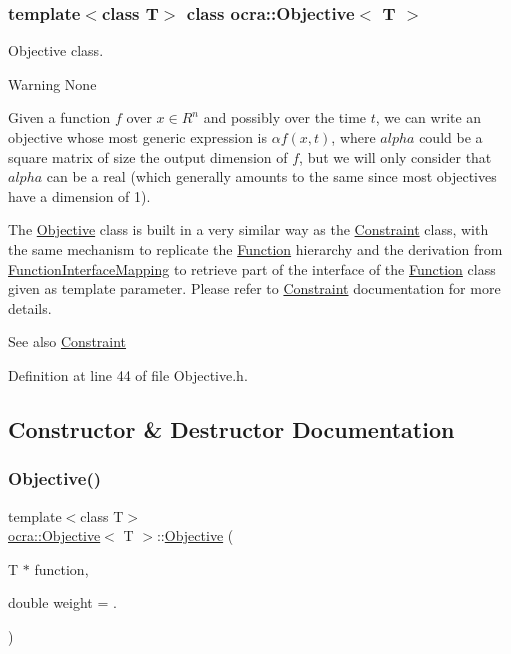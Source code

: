 \subsubsection*{template$<$class T$>$\newline
class ocra\+::\+Objective$<$ T $>$}

Objective class. 

\begin{DoxyWarning}{Warning}
None
\end{DoxyWarning}
Given a function $ f $ over $ x \in R^n $ and possibly over the time $ t $, we can write an objective whose most generic expression is $ \alpha f(x,t) $, where $ alpha $ could be a square matrix of size the output dimension of $ f $, but we will only consider that $ alpha $ can be a real (which generally amounts to the same since most objectives have a dimension of 1).

The \hyperlink{classocra_1_1Objective}{Objective} class is built in a very similar way as the \hyperlink{classocra_1_1Constraint}{Constraint} class, with the same mechanism to replicate the \hyperlink{classocra_1_1Function}{Function} hierarchy and the derivation from \hyperlink{structocra_1_1FunctionInterfaceMapping}{Function\+Interface\+Mapping} to retrieve part of the interface of the \hyperlink{classocra_1_1Function}{Function} class given as template parameter. Please refer to \hyperlink{classocra_1_1Constraint}{Constraint} documentation for more details.

\begin{DoxySeeAlso}{See also}
\hyperlink{classocra_1_1Constraint}{Constraint} 
\end{DoxySeeAlso}


Definition at line 44 of file Objective.\+h.



\subsection{Constructor \& Destructor Documentation}
\hypertarget{classocra_1_1Objective_a8ece61f7359bcc67cc5a10fde1ddd11d}{}\label{classocra_1_1Objective_a8ece61f7359bcc67cc5a10fde1ddd11d} 
\subsubsection{\texorpdfstring{Objective()}{Objective()}}
{\footnotesize\ttfamily template$<$class T$>$ \\
\hyperlink{classocra_1_1Objective}{ocra\+::\+Objective}$<$ T $>$\+::\hyperlink{classocra_1_1Objective}{Objective} (\begin{DoxyParamCaption}\item[{T $\ast$}]{function,  }\item[{double}]{weight = {.} }\end{DoxyParamCaption})\hspace{0.3cm}{\ttfamily [inline]}}



